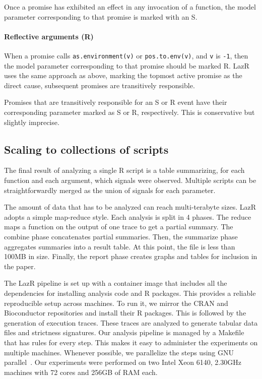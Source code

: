 \documentclass[review,nonacm,screen,acmsmall,anonymous=true]{acmart}
\newcommand{\code}[1]{\lstinline |#1|\xspace}
\renewcommand{\c}[1]{\lstinline |#1|\xspace}
\newcommand{\lazr}{{\sf LazR}\xspace}
\begin{document}
Once a promise has exhibited an effect in any invocation of a function, the
model parameter corresponding to that promise is marked with an S.

\paragraph{Reflective arguments (R)}
When a promise calls \code{as.environment(v)} or \code{pos.to.env(v)}, and
\c v is \c{-1}, then the model parameter corresponding to that promise should be
marked R. \lazr uses the same approach as above, marking the topmost active
promise as the direct cause, subsequent promises are transitively responsible.

\medskip

Promises that are transitively responsible for an S or R event have their
corresponding parameter marked as S or R, respectively. This is conservative but
slightly imprecise.

\newpage
\subsection{Scaling to collections of scripts}

The final result of analyzing a single R script is a table summarizing, for each
function and each argument, which signals were observed. Multiple scripts can be
straightforwardly merged as the union of signals for each parameter.

The amount of data that has to be analyzed can reach multi-terabyte sizes. \lazr adopts
a simple map-reduce style. Each analysis is split in 4 phases. The reduce maps
a function on the output of one trace to get a partial summary. The combine
phase concatenates partial summaries. Then, the summarize phase aggregates
summaries into a result table. At this point, the file is less than 100MB in
size. Finally, the report phase creates graphs and tables for inclusion in
the paper.

The \lazr pipeline is set up with a container image that includes all the
dependencies for installing analysis code and R packages. This provides a
reliable reproducible setup across machines. To run it, we mirror the CRAN and
Bioconductor repositories and install their R packages. This is followed by the
generation of execution traces. These traces are analyzed to generate tabular
data files and strictness signatures. Our analysis pipeline is managed by a
Makefile that has rules for every step. This makes it easy to administer the
experiments on multiple machines. Whenever possible, we parallelize the steps
using GNU parallel~\cite{gnuparallel}. Our experiments were performed on two Intel
Xeon 6140, 2.30GHz machines with 72 cores and 256GB of RAM each.
\end{document}

